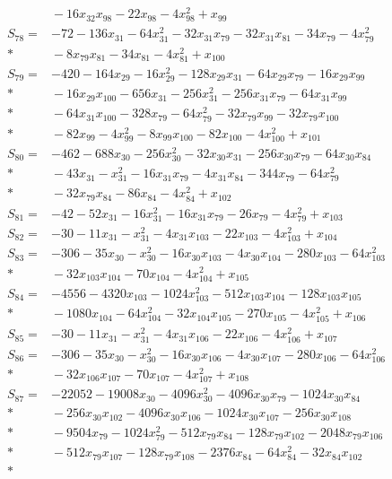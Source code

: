 \begin{align*}
&{}-16x_{32}x_{98}-22x_{98}-4x_{98}^{2}+x_{99}\\[3pt]
S_{78}={}&-72-136x_{31}-64x_{31}^{2}-32x_{31}x_{79}-32x_{31}x_{81}-34x_{79}-4x_{79}^{2}\\*
&{}-8x_{79}x_{81}-34x_{81}-4x_{81}^{2}+x_{100}\\[3pt]
S_{79}={}&-420-164x_{29}-16x_{29}^{2}-128x_{29}x_{31}-64x_{29}x_{79}-16x_{29}x_{99}\\*
&{}-16x_{29}x_{100}-656x_{31}-256x_{31}^{2}-256x_{31}x_{79}-64x_{31}x_{99}\\*
&{}-64x_{31}x_{100}-328x_{79}-64x_{79}^{2}-32x_{79}x_{99}-32x_{79}x_{100}\\*
&{}-82x_{99}-4x_{99}^{2}-8x_{99}x_{100}-82x_{100}-4x_{100}^{2}+x_{101}\\[3pt]
S_{80}={}&-462-688x_{30}-256x_{30}^{2}-32x_{30}x_{31}-256x_{30}x_{79}-64x_{30}x_{84}\\*
&{}-43x_{31}-x_{31}^{2}-16x_{31}x_{79}-4x_{31}x_{84}-344x_{79}-64x_{79}^{2}\\*
&{}-32x_{79}x_{84}-86x_{84}-4x_{84}^{2}+x_{102}\\[3pt]
S_{81}={}&-42-52x_{31}-16x_{31}^{2}-16x_{31}x_{79}-26x_{79}-4x_{79}^{2}+x_{103}\\[3pt]
S_{82}={}&-30-11x_{31}-x_{31}^{2}-4x_{31}x_{103}-22x_{103}-4x_{103}^{2}+x_{104}\\[3pt]
S_{83}={}&-306-35x_{30}-x_{30}^{2}-16x_{30}x_{103}-4x_{30}x_{104}-280x_{103}-64x_{103}^{2}\\*
&{}-32x_{103}x_{104}-70x_{104}-4x_{104}^{2}+x_{105}\\[3pt]
S_{84}={}&-4556-4320x_{103}-1024x_{103}^{2}-512x_{103}x_{104}-128x_{103}x_{105}\\*
&{}-1080x_{104}-64x_{104}^{2}-32x_{104}x_{105}-270x_{105}-4x_{105}^{2}+x_{106}\\[3pt]
S_{85}={}&-30-11x_{31}-x_{31}^{2}-4x_{31}x_{106}-22x_{106}-4x_{106}^{2}+x_{107}\\[3pt]
S_{86}={}&-306-35x_{30}-x_{30}^{2}-16x_{30}x_{106}-4x_{30}x_{107}-280x_{106}-64x_{106}^{2}\\*
&{}-32x_{106}x_{107}-70x_{107}-4x_{107}^{2}+x_{108}\\[3pt]
S_{87}={}&-22052-19008x_{30}-4096x_{30}^{2}-4096x_{30}x_{79}-1024x_{30}x_{84}\\*
&{}-256x_{30}x_{102}-4096x_{30}x_{106}-1024x_{30}x_{107}-256x_{30}x_{108}\\*
&{}-9504x_{79}-1024x_{79}^{2}-512x_{79}x_{84}-128x_{79}x_{102}-2048x_{79}x_{106}\\*
&{}-512x_{79}x_{107}-128x_{79}x_{108}-2376x_{84}-64x_{84}^{2}-32x_{84}x_{102}\\*

\end{align*}
